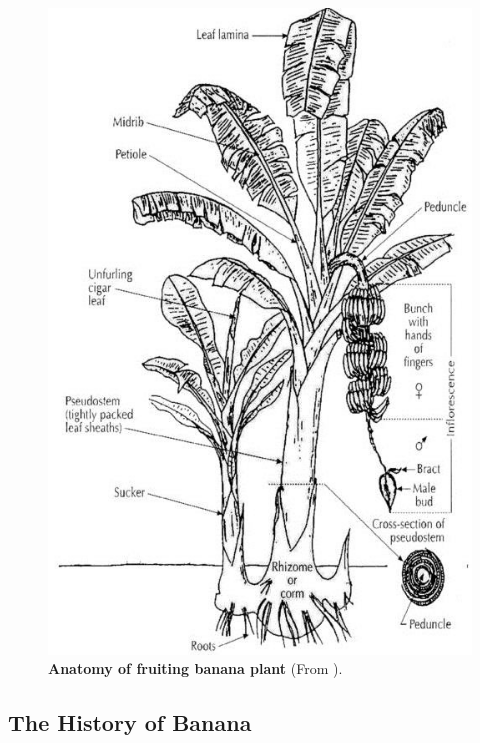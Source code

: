 \afterpage



\begin{figure}[hp!]
    \centering
    \includegraphics[width=12cm]{Figures/Diagrammatic-representation-of-a-fruiting-banana-plant-with-suckers-in-Bakry-et-al_W640.jpg}
    \caption[Anatomy of fruiting banana plant]{\textbf{Anatomy of fruiting banana plant} (From \parencite{Bakry2009}).}
    \label{fig:Anatomy of fruiting banana plant}
\end{figure}
\clearpage

\subsection{The History of Banana}

